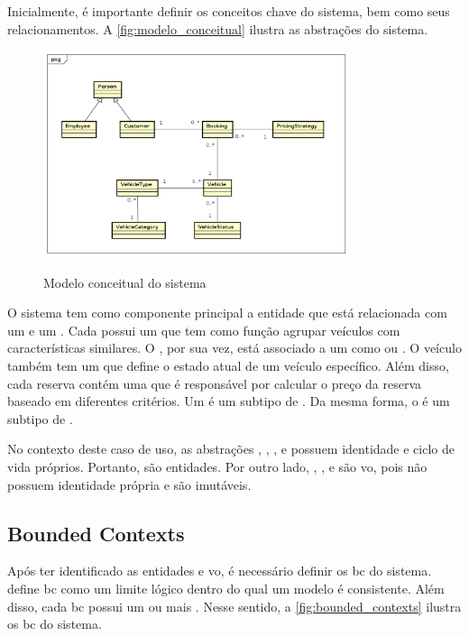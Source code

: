 Inicialmente, é importante definir os conceitos chave do sistema, bem como seus relacionamentos. A \autoref{fig:modelo_conceitual} ilustra as abstrações do sistema.

\begin{figure}[H]
    \centering
    \caption{Modelo conceitual do sistema}
    \includegraphics[width=0.8\textwidth]{media/modelo_conceitual.png}
    \label{fig:modelo_conceitual}
\end{figure}

O sistema tem como componente principal a entidade  que está relacionada com um  e um . Cada  possui um  que tem como função agrupar veículos com características similares. O , por sua vez, está associado a um  como  ou . O veículo também tem um  que define o estado atual de um veículo específico. Além disso, cada reserva contém uma  que é responsável por calcular o preço da reserva baseado em diferentes critérios. Um  é um subtipo de . Da mesma forma, o  é um subtipo de .

No contexto deste caso de uso, as abstrações , , ,  e  possuem identidade e ciclo de vida próprios. Portanto, são entidades. Por outro lado, , ,  e  são \acrfull{vo}, pois não possuem identidade própria e são imutáveis. 

\subsection{Bounded Contexts}
Após ter identificado as entidades e \acrshort{vo}, é necessário definir os \acrshort{bc} do sistema.  define \acrshort{bc} como um limite lógico dentro do qual um modelo é consistente. Além disso, cada \acrshort{bc} possui um ou mais . Nesse sentido, a \autoref{fig:bounded_contexts} ilustra os \acrshort{bc} do sistema.

